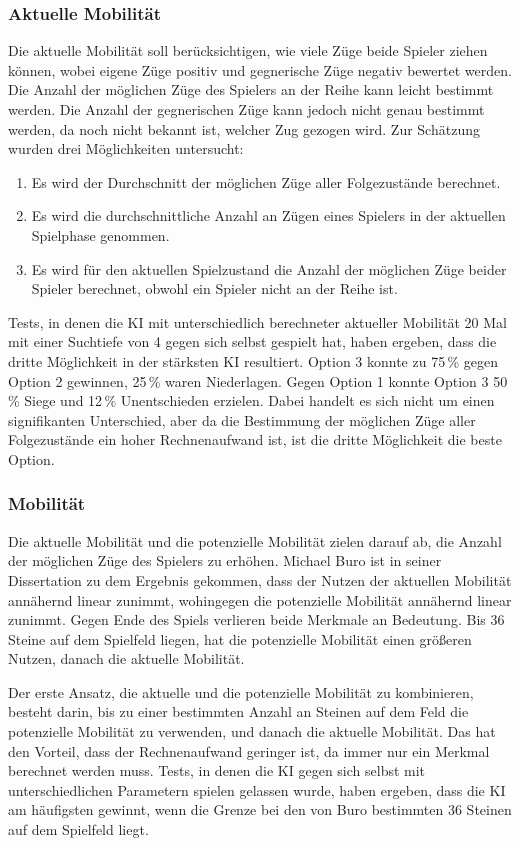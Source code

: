 \subsubsection{Aktuelle Mobilität}
Die aktuelle Mobilität soll berücksichtigen, wie viele Züge beide Spieler ziehen können, wobei eigene Züge positiv und
gegnerische Züge negativ bewertet werden. Die Anzahl der möglichen Züge des Spielers an der Reihe kann leicht bestimmt
werden. Die Anzahl der gegnerischen Züge kann jedoch nicht genau bestimmt werden, da noch nicht bekannt ist, welcher Zug
gezogen wird. Zur Schätzung wurden drei Möglichkeiten untersucht:
\begin{enumerate}
    \item Es wird der Durchschnitt der möglichen Züge aller Folgezustände berechnet.
    \item Es wird die durchschnittliche Anzahl an Zügen eines Spielers in der aktuellen Spielphase genommen.
    \item Es wird für den aktuellen Spielzustand die Anzahl der möglichen Züge beider Spieler berechnet, obwohl ein
    Spieler nicht an der Reihe ist.
\end{enumerate}
Tests, in denen die KI mit unterschiedlich berechneter aktueller Mobilität 20 Mal mit einer Suchtiefe von 4 gegen sich
selbst gespielt hat, haben ergeben, dass die dritte Möglichkeit in der stärksten KI resultiert. Option 3 konnte zu
75\,\% gegen Option 2 gewinnen, 25\,\% waren Niederlagen. Gegen Option 1 konnte Option 3 50\,\% Siege und 12\,\%
Unentschieden erzielen. Dabei handelt es sich nicht um einen signifikanten Unterschied, aber da die Bestimmung der
möglichen Züge aller Folgezustände ein hoher Rechnenaufwand ist, ist die dritte Möglichkeit die beste Option.

\subsubsection{Mobilität}
Die aktuelle Mobilität und die potenzielle Mobilität zielen darauf ab, die Anzahl der möglichen Züge des Spielers zu
erhöhen. Michael Buro ist in seiner Dissertation zu dem Ergebnis gekommen, dass der Nutzen der aktuellen Mobilität
annähernd linear zunimmt, wohingegen die potenzielle Mobilität annähernd linear zunimmt. Gegen Ende des Spiels verlieren
beide Merkmale an Bedeutung. Bis 36 Steine auf dem Spielfeld liegen, hat die potenzielle Mobilität einen größeren
Nutzen, danach die aktuelle Mobilität. \cite[S.~20]{evaluationfunctions}

Der erste Ansatz, die aktuelle und die potenzielle Mobilität zu kombinieren, besteht darin, bis zu einer bestimmten
Anzahl an Steinen auf dem Feld die potenzielle Mobilität zu verwenden, und danach die aktuelle Mobilität. Das hat den
Vorteil, dass der Rechnenaufwand geringer ist, da immer nur ein Merkmal berechnet werden muss. Tests, in denen die KI
gegen sich selbst mit unterschiedlichen Parametern spielen gelassen wurde, haben ergeben, dass die KI am häufigsten
gewinnt, wenn die Grenze bei den von Buro bestimmten 36 Steinen auf dem Spielfeld liegt.

